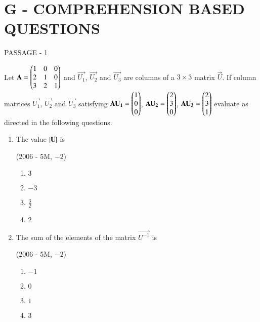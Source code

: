 \documentclass[journal,12pt,onecolumn]{IEEEtran}
\theoremstyle{remark}
\begin{document}
\bigskip

\section*{G - COMPREHENSION BASED QUESTIONS}

\bigskip

\begin{multicols}{2}

	{\centering PASSAGE - 1 \par}

	\bigskip	

	Let $\mathbf{A} = \begin{pmatrix}
		1 & 0 & 0 \\
		2 & 1 & 0 \\
	3 & 2 & 1 \end{pmatrix}$ and $\vec{U_1}$, $\vec{U_2}$ and $\vec{U_3}$ are columns of a $3\times3$ matrix $\vec{U}$. If column matrices $\vec{U_1}$, $\vec{U_2}$ and $\vec{U_3}$ satisfying 
	$\mathbf{AU_1} = \begin{pmatrix}
		1 \\
		0 \\
		0 \end{pmatrix}$,
	$\mathbf{AU_2} = \begin{pmatrix}
		2 \\
		3 \\
		0 \end{pmatrix}$,
	$\mathbf{AU_3} = \begin{pmatrix}
		2 \\
		3 \\
		1 \end{pmatrix}$ evaluate as directed in the following questions.

	\begin{enumerate}
		\item The value $\left\vert\mathbf{U}\right\vert$ is

			\hfill(2006 - 5M, $-2$)

			\begin{enumerate}
				\item $3$
				\item $-3$
			\item $\frac{3}{2}$
				\item $2$
			\end{enumerate}

		\item The sum of the elements of the matrix $\vec{U^{-1}}$ is

			\hfill(2006 - 5M, $-2$)

			\begin{enumerate}
				\item $-1$
				\item $0$
				\item $1$
				\item $3$
			\end{enumerate}


\end{enumerate}
\end{multicols}
\end{document}
